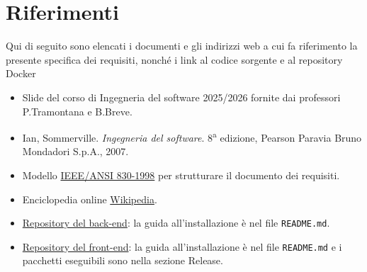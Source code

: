 \section{Riferimenti}
Qui di seguito sono elencati i documenti e gli indirizzi web a cui fa riferimento la presente specifica dei requisiti, nonché i 
link al codice sorgente e al repository Docker
\begin{itemize}
    \item Slide del corso di Ingegneria del software 2025/2026 fornite dai professori P.Tramontana e B.Breve.
    \item Ian, Sommerville. \textit{Ingegneria del software}. 8\textsuperscript{a} edizione, Pearson Paravia Bruno Mondadori S.p.A., 2007.
    \item Modello \href{https://ieeexplore.ieee.org/document/720574}{IEEE/ANSI 830-1998} per strutturare il documento dei requisiti.
    \item Enciclopedia online \href{https://it.wikipedia.org/wiki/Pagina_principale}{Wikipedia}. 
    \item \href{https://github.com/ubiestubi/ProgettoIngSoft}{Repository del back-end}: la guida
      all'installazione è nel file \texttt{README.md}.
    \item \href{https://github.com/GiandomenicoIameo/BugBoard26/}{Repository del front-end}: la guida
      all'installazione è nel file \texttt{README.md} e i pacchetti eseguibili sono nella sezione Release.
\end{itemize}






